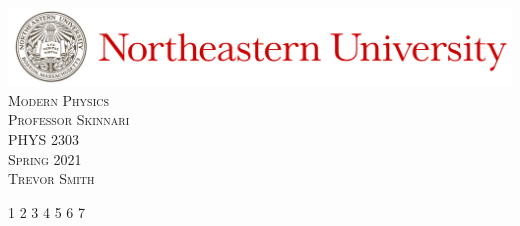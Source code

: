 \documentclass{article}
\newcommand\course{PHYS 2303}
\newcommand\coursetitle{Modern Physics}
\newcommand\prof{Skinnari}
\newcommand\semester{Spring 2021}
\newcommand\name{Trevor Smith}
\begin{document}
\begin{titlepage}
    \centering
    \includegraphics[width=\textwidth]{./Images/Header.jpeg}\\
    \vspace*{\fill}
    \textsc{\LARGE{\coursetitle}}\\[0.3cm]
    \textsc{\Large{Professor \prof}}\\[0.3cm]
    \textsc{\large{\course}}\\[0.3cm]
    \textsc{\large{\semester}}\\
    \vspace*{\fill}
    \textsc{\name}
\end{titlepage}
\thispagestyle{empty} 
\tableofcontents
\pagebreak
\setcounter{page}{1}
\pagestyle{fancy}

{1}
{2}
{3}
{4}
{5}
{6}
{7}
\end{document}
